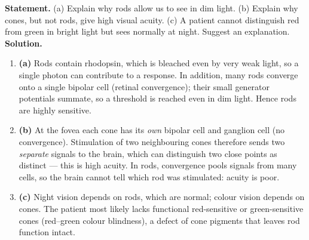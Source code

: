 \documentclass[11pt]{article}
\newcommand{\cle}[1]{{\popxbold\color{popdark}#1}}
\begin{document}
\begin{exoresolu}
\textbf{Statement.} (a) Explain why rods allow us to see in dim light. (b) Explain why cones, but not rods, give high visual acuity. (c) A patient cannot distinguish red from green in bright light but sees normally at night. Suggest an explanation.
\tcblower
\textbf{Solution.}
\begin{enumerate}
\item \textbf{(a)} Rods contain rhodopsin, which is bleached even by very weak light, so a single photon can contribute to a response. In addition, many rods converge onto a single bipolar cell (\cle{retinal convergence}); their small generator potentials summate, so a threshold is reached even in dim light. Hence rods are highly sensitive.
\item \textbf{(b)} At the fovea each cone has its \emph{own} bipolar cell and ganglion cell (no convergence). Stimulation of two neighbouring cones therefore sends two \emph{separate} signals to the brain, which can distinguish two close points as distinct — this is high acuity. In rods, convergence pools signals from many cells, so the brain cannot tell which rod was stimulated: acuity is poor.
\item \textbf{(c)} Night vision depends on rods, which are normal; colour vision depends on cones. The patient most likely lacks functional red-sensitive or green-sensitive cones (red–green colour blindness), a defect of cone pigments that leaves rod function intact.
\end{enumerate}
\end{exoresolu}
\end{document}
